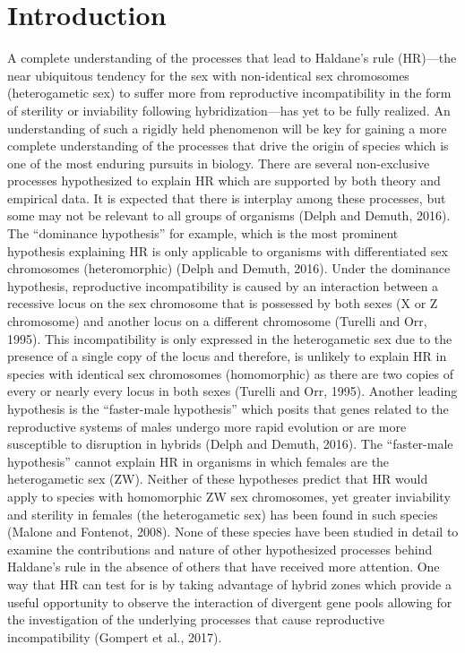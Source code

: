 \section{Introduction}
A complete understanding of the processes that lead to Haldane’s rule (HR)—the 
near ubiquitous tendency for the sex with non-identical sex chromosomes (heterogametic sex) 
to suffer more from reproductive incompatibility in the form of sterility or 
inviability following hybridization—has yet to be fully realized. 
An understanding of such a rigidly held phenomenon will be key for gaining a more 
complete understanding of the processes that drive the origin of species which is 
one of the most enduring pursuits in biology. There are several non-exclusive 
processes hypothesized to explain HR which are supported by both theory and 
empirical data. It is expected that there is interplay among these processes, 
but some may not be relevant to all groups of organisms (Delph and Demuth, 2016). 
The “dominance hypothesis” for example, which is the most prominent hypothesis 
explaining HR is only applicable to organisms with differentiated sex chromosomes 
(heteromorphic) (Delph and Demuth, 2016). Under the dominance hypothesis, 
reproductive incompatibility is caused by an interaction between a recessive locus 
on the sex chromosome that is possessed by both sexes (X or Z chromosome) and 
another locus on a different chromosome (Turelli and Orr, 1995). This incompatibility 
is only expressed in the heterogametic sex due to the presence of a single copy 
of the locus and therefore, is unlikely to explain HR in species with identical 
sex chromosomes (homomorphic) as there are two copies of every or nearly every 
locus in both sexes (Turelli and Orr, 1995). Another leading hypothesis is the 
“faster-male hypothesis” which posits that genes related to the reproductive 
systems of males undergo more rapid evolution or are more susceptible to 
disruption in hybrids (Delph and Demuth, 2016). The “faster-male hypothesis” 
cannot explain HR in organisms in which females are the heterogametic sex (ZW). 
Neither of these hypotheses predict that HR would apply to species with homomorphic
ZW sex chromosomes, yet greater inviability and sterility in females (the heterogametic sex) 
has been found in such species (Malone and Fontenot, 2008). None of these species 
have been studied in detail to examine the contributions and nature of other 
hypothesized processes behind Haldane’s rule in the absence of others that have 
received more attention. One way that HR can test for is by taking advantage of
hybrid zones which provide a useful opportunity to observe the interaction of 
divergent gene pools allowing for the investigation of the underlying processes
that cause reproductive incompatibility (Gompert et al., 2017).


